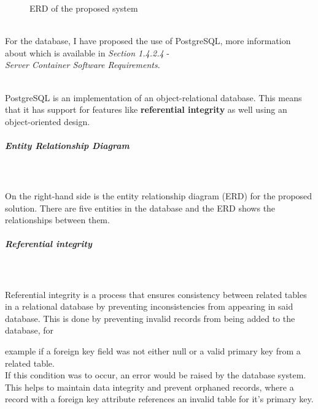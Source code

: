 \documentclass[../../main.tex]{subfiles}
\begin{document}
\begin{dummyenv}
\begin{wrapfigure}{r}[50pt]{0.6\textwidth}
\begin{framed}

            \caption{ERD of the proposed system}

        \end{framed}
        \label{fig:wrapfig}
    \end{wrapfigure}

    \noindent \\ For the database, I have proposed the use of
    PostgreSQL, more information about which is available in
    \textit{Section 1.4.2.4} - \\
    \textit{Server Container Software Requirements}.

    \noindent \\ PostgreSQL is an implementation of an object-relational
    database. This means that it has support for features like
    \textbf{referential integrity} as well using an object-oriented
    design.

    \subparagraph{Entity Relationship Diagram}

    \noindent \\\\ On the right-hand side is the entity relationship
    diagram (ERD) for the proposed solution. There are five entities
    in the database and the ERD shows the relationships between them.

    \subparagraph{Referential integrity}

    \noindent \\\\ Referential integrity is a process that ensures
    consistency between related tables in a relational database
    by preventing inconsistencies from appearing in said database.
    This is done by preventing invalid records from being added
    to the database, for

\end{dummyenv}

\noindent example if a foreign key field was not either
null or a valid primary key from a related table.
\noindent \\ If this condition was
to occur, an error would be raised by the database system.
This helps to maintain data integrity and prevent
orphaned records, where a record with a foreign key attribute
references an invalid table for it's primary key.
\end{document}
